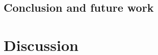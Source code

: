 \documentclass{sig-alternate}
\begin{document}
\subsection{Conclusion and future work}


\section{Discussion}

  
 

\end{document}
